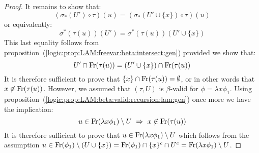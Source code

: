 \begin{proof}
    It remains to show that:
        \[
            (\sigma_{*}(U')\circ\tau)(u) 
            =
            (\sigma_{*}(U'\cup\{x\})\circ\tau)(u) 
        \]
    or equivalently:
        \[
            \sigma^{*}(\tau(u))(U')
            =
            \sigma^{*}(\tau(u))(U'\cup\{x\})
        \]
    This last equality follows from
    proposition~(\ref{logic:prop:LAM:freevar:beta:intersect:gen}) provided
    we show that:
        \[
            U' \cap\mbox{\rm Fr}(\tau(u)) = (U'\cup\{x\})\cap\mbox{\rm Fr}(\tau(u))
        \]
    It is therefore sufficient to prove that $\{x\}\cap\mbox{\rm Fr}(\tau(u))=\emptyset$,
    or in other words that $x\not\in\mbox{\rm Fr}(\tau(u))$. However, we assumed that 
    $(\tau,U)$ is $\beta$-valid for $\phi=\lambda x\phi_{1}$. Using
    proposition~(\ref{logic:prop:LAM:beta:valid:recursion:lam:gen}) once more
    we have the implication:
        \[
            u\in\free(\lambda x\phi_{1})\setminus U\ 
            \Rightarrow\ 
            x\not\in\free(\tau(u))
        \]
    It is therefore sufficient to prove that $u\in\mbox{\rm Fr}(\lambda x\phi_{1})
    \setminus U$ which follows from the assumption $u\in\mbox{\rm Fr}(\phi_{1})
    \setminus(U\cup\{x\})=\mbox{\rm Fr}(\phi_{1})\cap\{x\}^{c}\cap U^{c}
    =\mbox{\rm Fr}(\lambda x\phi_{1})\setminus U$.
\end{proof}

